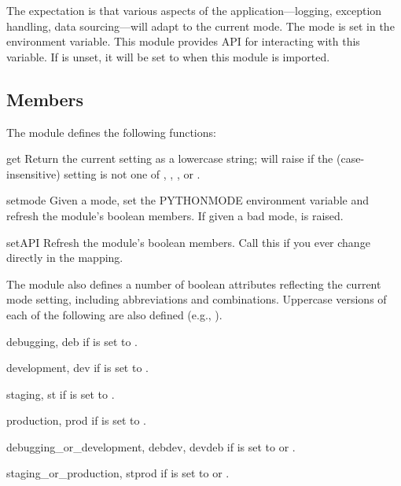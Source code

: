 The expectation is that various aspects of the application---logging, exception
handling, data sourcing---will adapt to the current mode. The mode is set in the
 environment variable. This module provides API for
interacting with this variable. If  is unset, it will be set
to  when this module is imported.

\subsection{Members}

The module defines the following functions:

\begin{funcdesc}{get}{}
Return the current  setting as a lowercase string; will raise
 if the (case-insensitive) setting is not one of
, , , or .
\end{funcdesc}

\begin{funcdesc}{set}{mode}
Given a mode, set the PYTHONMODE environment variable and refresh the module's
boolean members. If given a bad mode,  is raised.
\end{funcdesc}

\begin{funcdesc}{setAPI}{}
Refresh the module's boolean members. Call this if you ever change
 directly in the  mapping.
\end{funcdesc}

The module also defines a number of boolean attributes reflecting the current
mode setting, including abbreviations and combinations. Uppercase versions of
each of the following are also defined (e.g., ).

\begin{datadesc}{debugging, deb}
 if  is set to .
\end{datadesc}
\begin{datadesc}{development, dev}
 if  is set to .
\end{datadesc}
\begin{datadesc}{staging, st}
 if  is set to .
\end{datadesc}
\begin{datadesc}{production, prod}
 if  is set to .
\end{datadesc}
\begin{datadesc}{debugging_or_development, debdev, devdeb}
 if  is set to  or .
\end{datadesc}
\begin{datadesc}{staging_or_production, stprod}
 if  is set to  or .
\end{datadesc}


